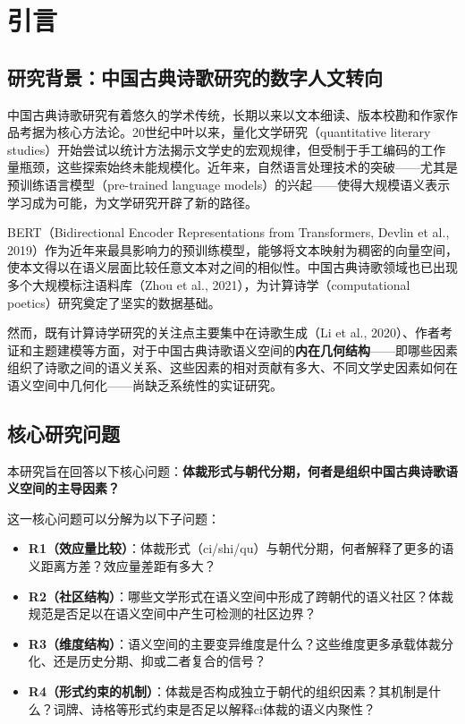 \documentclass[12pt,a4paper]{article}
\numberwithin{equation}{section}
\begin{document}
\noindent

\section{引言}

\subsection{研究背景：中国古典诗歌研究的数字人文转向}

中国古典诗歌研究有着悠久的学术传统，长期以来以文本细读、版本校勘和作家作品考据为核心方法论。20世纪中叶以来，量化文学研究（quantitative literary studies）开始尝试以统计方法揭示文学史的宏观规律，但受制于手工编码的工作量瓶颈，这些探索始终未能规模化。近年来，自然语言处理技术的突破——尤其是预训练语言模型（pre-trained language models）的兴起——使得大规模语义表示学习成为可能，为文学研究开辟了新的路径。

BERT（Bidirectional Encoder Representations from Transformers, Devlin et al., 2019）作为近年来最具影响力的预训练模型，能够将文本映射为稠密的向量空间，使本文得以在语义层面比较任意文本对之间的相似性。中国古典诗歌领域也已出现多个大规模标注语料库（Zhou et al., 2021），为计算诗学（computational poetics）研究奠定了坚实的数据基础。

然而，既有计算诗学研究的关注点主要集中在诗歌生成（Li et al., 2020）、作者考证和主题建模等方面，对于中国古典诗歌语义空间的\textbf{内在几何结构}——即哪些因素组织了诗歌之间的语义关系、这些因素的相对贡献有多大、不同文学史因素如何在语义空间中几何化——尚缺乏系统性的实证研究。

\subsection{核心研究问题}

本研究旨在回答以下核心问题：\textbf{体裁形式与朝代分期，何者是组织中国古典诗歌语义空间的主导因素？}

这一核心问题可以分解为以下子问题：

\begin{itemize}
  \item \textbf{R1（效应量比较）}：体裁形式（ci/shi/qu）与朝代分期，何者解释了更多的语义距离方差？效应量差距有多大？
  \item \textbf{R2（社区结构）}：哪些文学形式在语义空间中形成了跨朝代的语义社区？体裁规范是否足以在语义空间中产生可检测的社区边界？
  \item \textbf{R3（维度结构）}：语义空间的主要变异维度是什么？这些维度更多承载体裁分化、还是历史分期、抑或二者复合的信号？
  \item \textbf{R4（形式约束的机制）}：体裁是否构成独立于朝代的组织因素？其机制是什么？词牌、诗格等形式约束是否足以解释ci体裁的语义内聚性？
\end{itemize}
\end{document}
